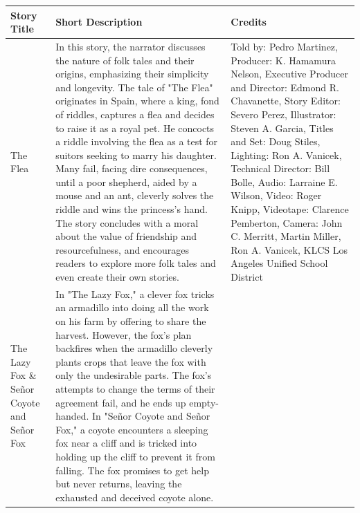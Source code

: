 \begin{table}[h]
    \centering
    \begin{small}

        \begin{tabular}{|p{1.5cm}|p{8.5cm}|p{7cm}|}
            \hline
            \textbf{Story Title} & \textbf{Short Description} & \textbf{Credits} \\
            \hline
            The Flea
                                 &
            In this story, the narrator discusses the nature of folk tales and their origins, emphasizing their simplicity and longevity.
            The tale of "The Flea" originates in Spain, where a king, fond of riddles, captures a flea and decides to raise it as a royal pet.
            He concocts a riddle involving the flea as a test for suitors seeking to marry his daughter.
            Many fail, facing dire consequences, until a poor shepherd, aided by a mouse and an ant, cleverly solves the riddle and wins the princess's hand.
            The story concludes with a moral about the value of friendship and resourcefulness, and encourages readers to explore more folk tales and even create their own stories.
                                 &
            Told by: Pedro Martinez,
            Producer: K. Hamamura Nelson,
            Executive Producer and Director: Edmond R. Chavanette,
            Story Editor: Severo Perez,
            Illustrator: Steven A. Garcia,
            Titles and Set: Doug Stiles,
            Lighting: Ron A. Vanicek,
            Technical Director: Bill Bolle,
            Audio: Larraine E. Wilson,
            Video: Roger Knipp,
            Videotape: Clarence Pemberton,
            Camera: John C. Merritt, Martin Miller, Ron A. Vanicek,
            KLCS Los Angeles Unified School District
            \\
            \hline
            The Lazy Fox \& Señor Coyote and Señor Fox
                                 &
            In "The Lazy Fox," a clever fox tricks an armadillo into doing all the work on his farm by offering to share the harvest.
            However, the fox's plan backfires when the armadillo cleverly plants crops that leave the fox with only the undesirable parts.
            The fox's attempts to change the terms of their agreement fail, and he ends up empty-handed.
            In "Señor Coyote and Señor Fox," a coyote encounters a sleeping fox near a cliff and is tricked into holding up the cliff to prevent it from falling.
            The fox promises to get help but never returns, leaving the exhausted and deceived coyote alone.

\end{tabular}
\end{small}
\end{table}
